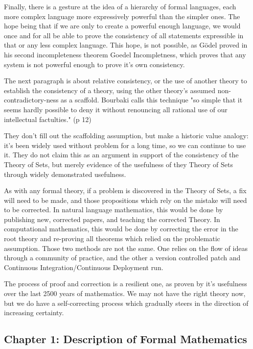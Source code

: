 \documentclass[]{scrartcl}
\begin{document}
Finally, there is a gesture at the idea of a hierarchy of formal languages, each more complex language more expressively powerful than the simpler ones. The hope being that if we are only to create a powerful enough language, we would once and for all be able to prove the consistency of all statements expressible in that or any less complex language. This hope, is not possible, as G\"odel proved in his second incompleteness theorem {Goedel Incompletness}, which proves that any system is not powerful enough to prove it's own consistency.

The next paragraph is about relative consistency, or the use of another theory to establish the consistency of a theory, using the other theory's assumed non-contradictory-ness as a scaffold. Bourbaki calls this technique "so simple that it seems hardly possible to deny it without renouncing all rational use of our intellectual factulties." (p 12)

They don't fill out the scaffolding assumption, but make a historic value analogy: it's been widely used without problem for a long time, so we can continue to use it. They do not claim this as an argument in support of the consistency of the Theory of Sets, but merely evidence of the usefulness of they Theory of Sets through widely demonstrated usefulness.

As with any formal theory, if a problem is discovered in the Theory of Sets, a fix will need to be made, and those propositions which rely on the mistake will need to be corrected. In natural language mathematics, this would be done by publishing new, corrected papers, and teaching the corrected Theory. In computational mathematics, this would be done by correcting the error in the root theory and re-proving all theorems which relied on the problematic assumption. Those two methods are not the same. One relies on the flow of ideas through a community of practice, and the other a version controlled patch and Continuous Integration/Continuous Deployment run.

The process of proof and correction is a resilient one, as proven by it's usefulness over the last 2500 years of mathematics. We may not have the right theory now, but we do have a self-correcting process which gradually steers in the direction of increasing certainty.

\subsection{Chapter 1: Description of Formal Mathematics}
\end{document}
